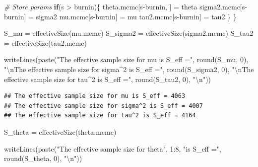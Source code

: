 \documentclass[
  11pt,
]{article}
\newenvironment{Shaded}{\begin{snugshade}}{\end{snugshade}}
\newcommand{\CommentTok}[1]{\textcolor[rgb]{0.56,0.35,0.01}{\textit{#1}}}
\newcommand{\ControlFlowTok}[1]{\textcolor[rgb]{0.13,0.29,0.53}{\textbf{#1}}}
\newcommand{\DecValTok}[1]{\textcolor[rgb]{0.00,0.00,0.81}{#1}}
\newcommand{\FunctionTok}[1]{\textcolor[rgb]{0.00,0.00,0.00}{#1}}
\newcommand{\NormalTok}[1]{#1}
\newcommand{\OtherTok}[1]{\textcolor[rgb]{0.56,0.35,0.01}{#1}}
\newcommand{\SpecialCharTok}[1]{\textcolor[rgb]{0.00,0.00,0.00}{#1}}
\newcommand{\StringTok}[1]{\textcolor[rgb]{0.31,0.60,0.02}{#1}}
\begin{document}
\begin{Shaded}
\begin{Highlighting}[]
  \CommentTok{\# Store params}
  \ControlFlowTok{if}\NormalTok{(s }\SpecialCharTok{\textgreater{}}\NormalTok{ burnin)\{}
\NormalTok{    theta.mcmc[s}\SpecialCharTok{{-}}\NormalTok{burnin, ] }\OtherTok{=}\NormalTok{ theta}
\NormalTok{    sigma2.mcmc[s}\SpecialCharTok{{-}}\NormalTok{burnin] }\OtherTok{=}\NormalTok{ sigma2}
\NormalTok{    mu.mcmc[s}\SpecialCharTok{{-}}\NormalTok{burnin] }\OtherTok{=}\NormalTok{ mu}
\NormalTok{    tau2.mcmc[s}\SpecialCharTok{{-}}\NormalTok{burnin] }\OtherTok{=}\NormalTok{ tau2}
\NormalTok{  \}}
\NormalTok{\}}
\end{Highlighting}
\end{Shaded}

\normalsize

\scriptsize

\begin{Shaded}
\begin{Highlighting}[]
\NormalTok{S\_mu }\OtherTok{=} \FunctionTok{effectiveSize}\NormalTok{(mu.mcmc)}
\NormalTok{S\_sigma2 }\OtherTok{=} \FunctionTok{effectiveSize}\NormalTok{(sigma2.mcmc)}
\NormalTok{S\_tau2 }\OtherTok{=} \FunctionTok{effectiveSize}\NormalTok{(tau2.mcmc)}

\FunctionTok{writeLines}\NormalTok{(}\FunctionTok{paste}\NormalTok{(}\StringTok{"The effective sample size for mu is S\_eff ="}\NormalTok{, }\FunctionTok{round}\NormalTok{(S\_mu, }\DecValTok{0}\NormalTok{), }\StringTok{"}\SpecialCharTok{\textbackslash{}n}\StringTok{The effective sample size for sigma\^{}2 is S\_eff ="}\NormalTok{, }\FunctionTok{round}\NormalTok{(S\_sigma2, }\DecValTok{0}\NormalTok{), }\StringTok{"}\SpecialCharTok{\textbackslash{}n}\StringTok{The effective sample size for tau\^{}2 is S\_eff ="}\NormalTok{, }\FunctionTok{round}\NormalTok{(S\_tau2, }\DecValTok{0}\NormalTok{), }\StringTok{"}\SpecialCharTok{\textbackslash{}n}\StringTok{"}\NormalTok{))}
\end{Highlighting}
\end{Shaded}

\begin{verbatim}
## The effective sample size for mu is S_eff = 4063 
## The effective sample size for sigma^2 is S_eff = 4007 
## The effective sample size for tau^2 is S_eff = 4164
\end{verbatim}

\begin{Shaded}
\begin{Highlighting}[]
\NormalTok{S\_theta }\OtherTok{=} \FunctionTok{effectiveSize}\NormalTok{(theta.mcmc)}

\FunctionTok{writeLines}\NormalTok{(}\FunctionTok{paste}\NormalTok{(}\StringTok{"The effective sample size for theta"}\NormalTok{, }\DecValTok{1}\SpecialCharTok{:}\DecValTok{8}\NormalTok{, }\StringTok{"is S\_eff ="}\NormalTok{, }\FunctionTok{round}\NormalTok{(S\_theta, }\DecValTok{0}\NormalTok{), }\StringTok{"}\SpecialCharTok{\textbackslash{}n}\StringTok{"}\NormalTok{))}
\end{Highlighting}
\end{Shaded}
\end{document}
